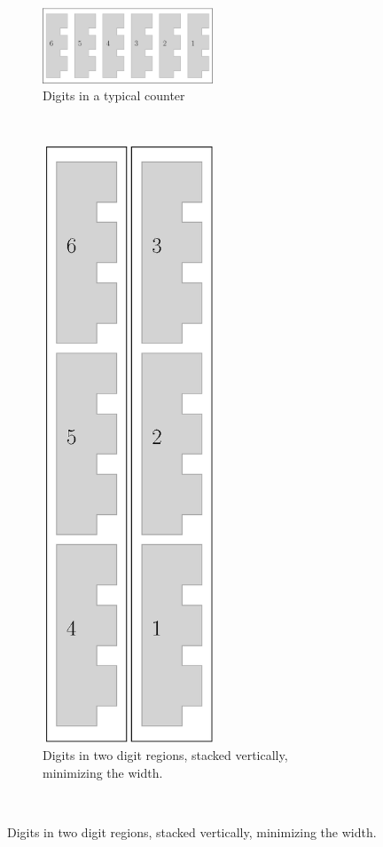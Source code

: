 \begin{figure}[H]
    \centering
    \begin{subfigure}[t]{0.48\textwidth}
        \centering
        \includegraphics[width=2in]{digits_normal_counter}
        \caption{\label{fig:digits_normal_counter} Digits in a typical counter}
    \end{subfigure}%
    ~
    \begin{subfigure}[t]{0.48\textwidth}
        \centering
        \includegraphics[width=2in]{digits_digit_region_counter}
        \caption{\label{fig:digits_digit_region_counter} Digits in two digit regions, stacked vertically, minimizing the width. }
    \end{subfigure}%
    ~
\end{figure}


